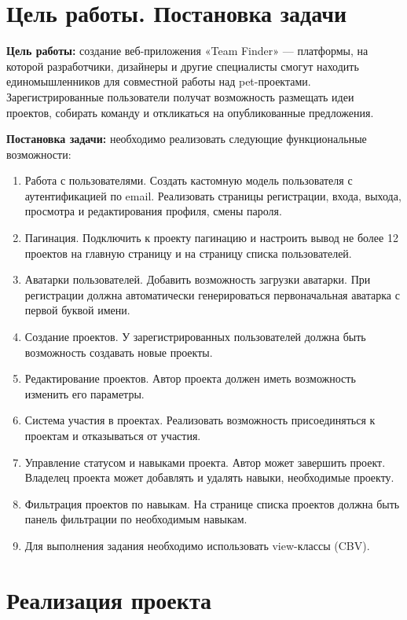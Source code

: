 \documentclass[bachelor, och, pract]{../SCWorks}
\begin{document}
\section{Цель работы. Постановка задачи}

\textbf{Цель работы:} создание веб-приложения «Team Finder» --- платформы, на которой разработчики, дизайнеры и другие специалисты смогут находить единомышленников для совместной работы над pet-проектами. Зарегистрированные пользователи получат возможность размещать идеи проектов, собирать команду и откликаться на опубликованные предложения.

\textbf{Постановка задачи:} необходимо реализовать следующие функциональные возможности:

\begin{enumerate}
    \item Работа с пользователями. Создать кастомную модель пользователя с аутентификацией по email. Реализовать страницы регистрации, входа, выхода, просмотра и редактирования профиля, смены пароля.
    \item Пагинация. Подключить к проекту пагинацию и настроить вывод не более 12 проектов на главную страницу и на страницу списка пользователей.
    \item Аватарки пользователей. Добавить возможность загрузки аватарки. При регистрации должна автоматически генерироваться первоначальная аватарка с первой буквой имени.
    \item Создание проектов. У зарегистрированных пользователей должна быть возможность создавать новые проекты.
    \item Редактирование проектов. Автор проекта должен иметь возможность изменить его параметры.
    \item Система участия в проектах. Реализовать возможность присоединяться к проектам и отказываться от участия.
    \item Управление статусом и навыками проекта. Автор может завершить проект. Владелец проекта может добавлять и удалять навыки, необходимые проекту.
    \item Фильтрация проектов по навыкам. На странице списка проектов должна быть панель фильтрации по необходимым навыкам.
    \item Для выполнения задания необходимо использовать view-классы (CBV).
\end{enumerate}

\section{Реализация проекта}
\end{document}
